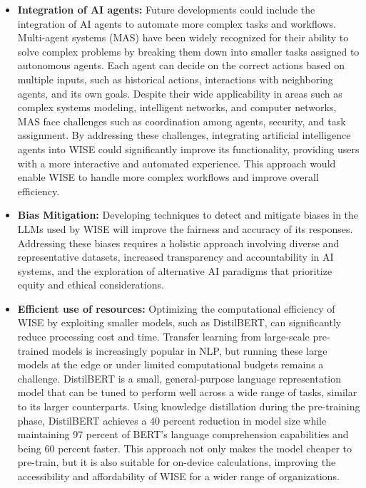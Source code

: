 \begin{itemize}
    \item \textbf{Integration of AI agents:} Future developments could include the integration of AI agents to automate more complex tasks and workflows. Multi-agent systems (MAS) have been widely recognized for their ability to solve complex problems by breaking them down into smaller tasks assigned to autonomous agents. Each agent can decide on the correct actions based on multiple inputs, such as historical actions, interactions with neighboring agents, and its own goals. Despite their wide applicability in areas such as complex systems modeling, intelligent networks, and computer networks, MAS face challenges such as coordination among agents, security, and task assignment. By addressing these challenges, integrating artificial intelligence agents into WISE could significantly improve its functionality, providing users with a more interactive and automated experience. This approach would enable WISE to handle more complex workflows and improve overall efficiency. \cite{dorri2018multi}

    \item \textbf{Bias Mitigation:} Developing techniques to detect and mitigate biases in the LLMs used by WISE will improve the fairness and accuracy of its responses. Addressing these biases requires a holistic approach involving diverse and representative datasets, increased transparency and accountability in AI systems, and the exploration of alternative AI paradigms that prioritize equity and ethical considerations. \cite{ferrara2023fairness}

    \item \textbf{Efficient use of resources:} Optimizing the computational efficiency of WISE by exploiting smaller models, such as DistilBERT, can significantly reduce processing cost and time. Transfer learning from large-scale pre-trained models is increasingly popular in NLP, but running these large models at the edge or under limited computational budgets remains a challenge. DistilBERT is a small, general-purpose language representation model that can be tuned to perform well across a wide range of tasks, similar to its larger counterparts. Using knowledge distillation during the pre-training phase, DistilBERT achieves a 40 percent reduction in model size while maintaining 97 percent of BERT's language comprehension capabilities and being 60 percent faster. This approach not only makes the model cheaper to pre-train, but it is also suitable for on-device calculations, improving the accessibility and affordability of WISE for a wider range of organizations. \cite{sanh2019distilbert}
\end{itemize}

